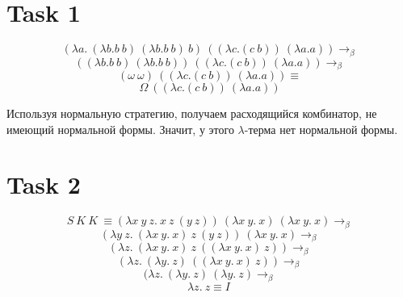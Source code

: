 ﻿\documentclass{article}
\begin{document}
\section*{\LARGE Task 1}
\LARGE$$(\lambda a.\ (\lambda b. b\ b)\ (\lambda b. b\ b)\ b)\ ((\lambda c. (c\ b))\ (\lambda a. a)) \rightarrow_\beta$$
$$((\lambda b. b\ b)\ (\lambda b. b\ b))\ ((\lambda c. (c\ b))\ (\lambda a. a)) \rightarrow_\beta$$
$$(\omega\ \omega)\ ((\lambda c. (c\ b))\ (\lambda a. a)) \equiv$$
$$\Omega\ ((\lambda c. (c\ b))\ (\lambda a. a))$$

Используя нормальную стратегию, получаем расходящийся комбинатор, не имеющий нормальной формы. 
Значит, у этого \(\lambda\)-терма нет нормальной формы.

\section*{\LARGE Task 2}
\LARGE$$S\ K\ K\ \equiv (\lambda x\ y\ z.\ x\ z\ (y\ z))\ (\lambda x\ y.\ x)\ (\lambda x\ y.\ x) \rightarrow_\beta$$
$$(\lambda y\ z.\ (\lambda x\ y.\ x)\ z\ (y\ z))\ (\lambda x\ y.\ x) \rightarrow_\beta$$
$$(\lambda z.\ (\lambda x\ y.\ x)\ z\ ((\lambda x\ y.\ x)\ z)) \rightarrow_\beta$$
$$(\lambda z.\ (\lambda y.\ z)\ ((\lambda x\ y.\ x)\ z)) \rightarrow_\beta$$
$$(\lambda z.\ (\lambda y.\ z)\ (\lambda y.\ z) \rightarrow_\beta$$
$$\lambda z.\ z \equiv I\ $$
\end{document}
